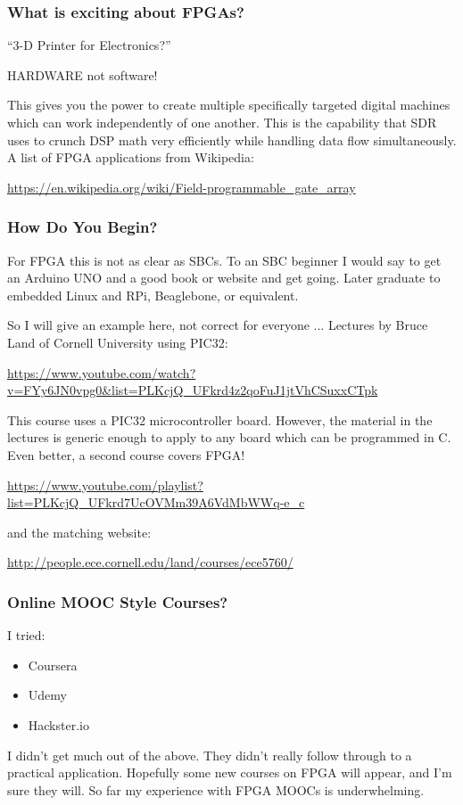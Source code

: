 \documentclass{beamer}
\begin{document}
\begin{frame}
\frametitle{What is exciting about FPGAs?}

``3-D Printer for Electronics?''

HARDWARE not software!

This gives you the power to create multiple specifically targeted digital machines which can work independently of one another.  This is the capability that SDR uses to crunch DSP math very efficiently while handling data flow simultaneously.  A list of FPGA applications from Wikipedia:

\url{https://en.wikipedia.org/wiki/Field-programmable_gate_array}

\end{frame}

\begin{frame}
\frametitle{How Do You Begin?}

For FPGA this is not as clear as SBCs.  To an SBC beginner I would say to get an Arduino UNO and a good book or website and get going.  Later graduate to embedded Linux and RPi, Beaglebone, or equivalent.

So I will give an example here, not correct for everyone ...
Lectures by Bruce Land of Cornell University using PIC32:

\begin{tiny}
\url{https://www.youtube.com/watch?v=FYy6JN0vpg0&list=PLKcjQ_UFkrd4z2qoFuJ1jtVhCSuxxCTpk}
\end{tiny}

This course uses a PIC32 microcontroller board.  However, the material in the lectures is generic enough to apply to any board which can be programmed in C.
Even better, a second course covers FPGA!

\begin{scriptsize}
\url{https://www.youtube.com/playlist?list=PLKcjQ_UFkrd7UcOVMm39A6VdMbWWq-e_c}
\end{scriptsize}

and the matching website:

\url{http://people.ece.cornell.edu/land/courses/ece5760/}

\end{frame}

\begin{frame}
\frametitle{Online MOOC Style Courses?}

I tried:

\begin{itemize}
	\item Coursera
\item Udemy
\item Hackster.io
\end{itemize}

I didn't get much out of the above.  They didn't really follow through to a practical application.  Hopefully some new courses on FPGA will appear, and I'm sure they will.
So far my experience with FPGA MOOCs is underwhelming.

\end{frame}
\end{document}
